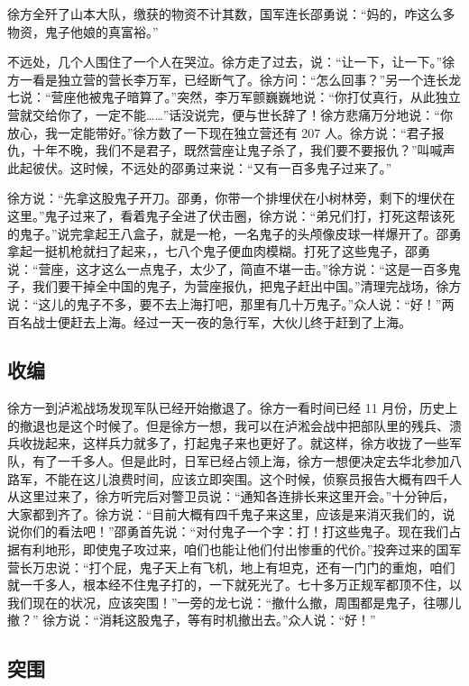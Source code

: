 \documentclass[UTF8,a4paper,titlepage,twoside,10.5pt]{article}
\begin{document}
徐方全歼了山本大队，缴获的物资不计其数，国军连长邵勇说：“妈的，咋这么多物资，鬼子他娘的真富裕。”

不远处，几个人围住了一个人在哭泣。徐方走了过去，说：“让一下，让一下。”徐方一看是独立营的营长李万军，已经断气了。徐方问：“怎么回事？”另一个连长龙七说：“营座他被鬼子暗算了。”突然，李万军颤巍巍地说：“你打仗真行，从此独立营就交给你了，一定不能……”话没说完，便与世长辞了！徐方悲痛万分地说：“你放心，我一定能带好。”徐方数了一下现在独立营还有 207 人。徐方说：“君子报仇，十年不晚，我们不是君子，既然营座让鬼子杀了，我们要不要报仇？”叫喊声此起彼伏。这时候，不远处的邵勇过来说：“又有一百多鬼子过来了。”

徐方说：“先拿这股鬼子开刀。邵勇，你带一个排埋伏在小树林旁，剩下的埋伏在这里。”鬼子过来了，看着鬼子全进了伏击圈，徐方说：“弟兄们打，打死这帮该死的鬼子。”说完拿起王八盒子，就是一枪，一名鬼子的头颅像皮球一样爆开了。邵勇拿起一挺机枪就扫了起来，，七八个鬼子便血肉模糊。打死了这些鬼子，邵勇说：“营座，这才这么一点鬼子，太少了，简直不堪一击。”徐方说：“这是一百多鬼子，我们要干掉全中国的鬼子，为营座报仇，把鬼子赶出中国。”清理完战场，徐方说：“这儿的鬼子不多，要不去上海打吧，那里有几十万鬼子。”众人说：“好！”两百名战士便赶去上海。经过一天一夜的急行军，大伙儿终于赶到了上海。

\subsection{收编}
\label{sec:org86ea2a8}

徐方一到泸淞战场发现军队已经开始撤退了。徐方一看时间已经 11 月份，历史上的撤退也是这个时候了。但是徐方一想，我可以在泸淞会战中把部队里的残兵、溃兵收拢起来，这样兵力就多了，打起鬼子来也更好了。就这样，徐方收拢了一些军队，有了一千多人。但是此时，日军已经占领上海，徐方一想便决定去华北参加八路军，不能在这儿浪费时间，应该立即突围。这个时候，侦察员报告大概有四千人从这里过来了，徐方听完后对警卫员说：“通知各连排长来这里开会。”十分钟后，大家都到齐了。徐方说：“目前大概有四千鬼子来这里，应该是来消灭我们的，说说你们的看法吧！”邵勇首先说：“对付鬼子一个字：打！打这些鬼子。现在我们占据有利地形，即使鬼子攻过来，咱们也能让他们付出惨重的代价。”投奔过来的国军营长万忠说：“打个屁，鬼子天上有飞机，地上有坦克，还有一门门的重炮，咱们就一千多人，根本经不住鬼子打的，一下就死光了。七十多万正规军都顶不住，以我们现在的状况，应该突围！”一旁的龙七说：“撤什么撤，周围都是鬼子，往哪儿撤？” 徐方说：“消耗这股鬼子，等有时机撤出去。”众人说：“好！”

\subsection{突围}
\label{sec:orgb129e38}
\end{document}
